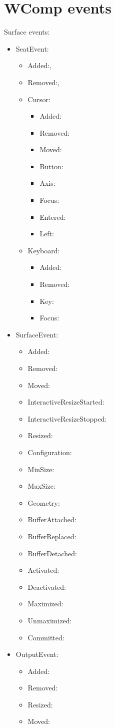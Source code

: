\section{WComp events}
Surface events:
\begin{itemize}
	\item SeatEvent: 
		\begin{itemize}
			\item Added:,
			\item Removed:,
			\item Cursor: 
				\begin{itemize}
					\item Added:
					\item Removed:
					\item Moved:
					\item Button:
					\item Axis:
					\item Focus:
					\item Entered:
					\item Left:
				\end{itemize}
			\item Keyboard:
				\begin{itemize}
					\item Added:
					\item Removed:
					\item Key:
					\item Focus:
				\end{itemize}
		\end{itemize}
	\item SurfaceEvent: \begin{itemize}
		\item Added:
		\item Removed:
		\item Moved:
		\item InteractiveResizeStarted:
		\item InteractiveResizeStopped:
		\item Resized:
		\item Configuration:
		\item MinSize:
		\item MaxSize:
		\item Geometry:
		\item BufferAttached:
		\item BufferReplaced:
		\item BufferDetached:
		\item Activated:
		\item Deactivated:
		\item Maximized:
		\item Unmaximized:
		\item Committed:
	\end{itemize}
	\item OutputEvent: \begin{itemize}
		\item Added:
		\item Removed:
		\item Resized:
		\item Moved:
	\end{itemize}
	
\end{itemize}